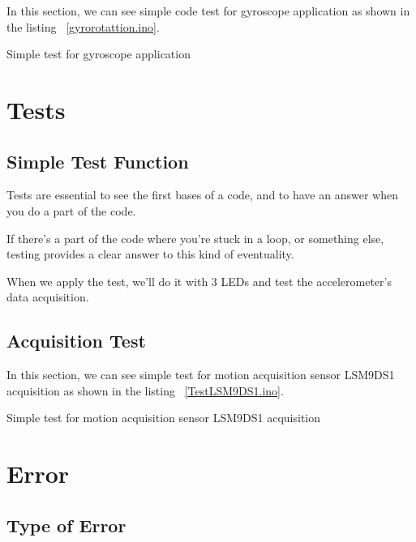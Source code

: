 In this section, we can see simple code test for gyroscope application as shown in the listing ~\ref{gyrorotattion.ino}.

\begin{code}
	
	
	\caption{Simple test for gyroscope application}\label{gyrorotattion.ino}
	
\end{code}

\section{Tests}
\subsection{Simple Test Function}
Tests are essential to see the first bases of a code, and to have an answer when you do a part of the code. 

If there's a part of the code where you're stuck in a loop, or something else, testing provides a clear answer to this kind of eventuality. 

When we apply the test, we'll do it with 3 LEDs and test the accelerometer's data acquisition. 

\subsection{Acquisition Test}

In this section, we can see simple test for motion acquisition sensor LSM9DS1 acquisition as shown in the listing ~\ref{TestLSM9DS1.ino}.

\begin{code}
	
	
	\caption{Simple test for motion acquisition sensor LSM9DS1 acquisition}\label{TestLSM9DS1.ino}
	
\end{code}


\section{Error}
\subsection{Type of Error}

